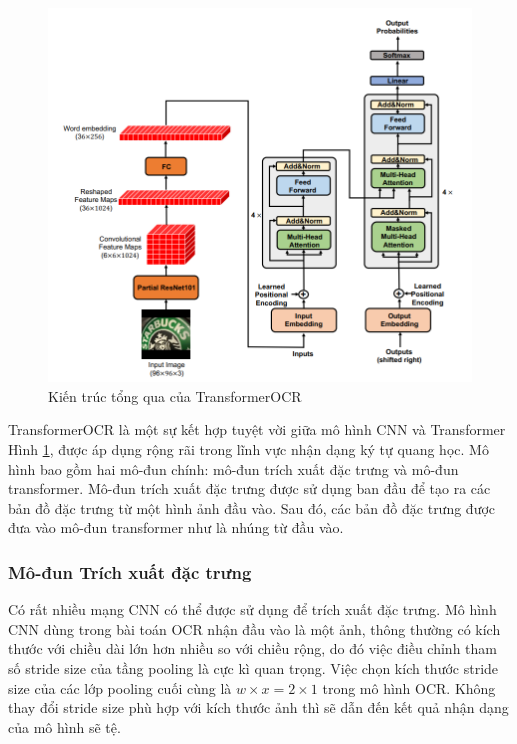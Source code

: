 \begin{figure}[h]
    \includegraphics[scale=0.65]{images/overview-transOCR.png}
    \centering
    \caption{Kiến trúc tổng qua của TransformerOCR \cite{feng2020scene}}
    \label{overview-transOCR}
\end{figure}

TransformerOCR là một sự kết hợp tuyệt vời giữa mô hình CNN và Transformer Hình \ref{overview-transOCR}, được áp dụng rộng rãi trong lĩnh vực nhận dạng ký tự quang học. Mô hình bao gồm hai mô-đun chính: mô-đun trích xuất đặc trưng và mô-đun transformer. Mô-đun trích xuất đặc trưng được sử dụng ban đầu để tạo ra các bản đồ đặc trưng từ một hình ảnh đầu vào. Sau đó, các bản đồ đặc trưng được đưa vào mô-đun transformer như là nhúng từ đầu vào.

\subsubsection*{Mô-đun Trích xuất đặc trưng}
Có rất nhiều mạng CNN có thể được sử dụng để trích xuất đặc trưng. Mô hình CNN dùng trong bài toán OCR nhận đầu vào là một ảnh, thông thường có kích thước với chiều dài lớn hơn nhiều so với chiều rộng, do đó việc điều chỉnh tham số stride size của tầng pooling là cực kì quan trọng. Việc chọn kích thước stride size của các lớp pooling cuối cùng là $w \times x = 2 \times 1$ trong mô hình OCR. Không thay đổi stride size phù hợp với kích thước ảnh thì sẽ dẫn đến kết quả nhận dạng của mô hình sẽ tệ.

